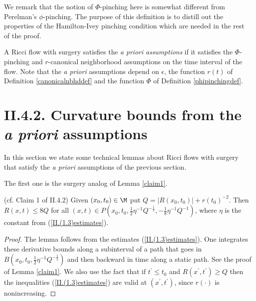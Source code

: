 We remark that the notion of $\Phi$-pinching here is somewhat
different from Perelman's $\phi$-pinching.  The purpose of
this definition is to distill out the properties of the
Hamilton-Ivey pinching condition which are needed in the rest of the
proof.

\begin{definition}
  \label{def:kl-priori-assumptions-surgery-priori-assumptions}
 \label{apriori}
A Ricci flow with surgery satisfies the {\em {\it a priori} assumptions}
if it satisfies the $\Phi$-pinching and $r$-canonical
neighborhood assumptions
on the time interval of the flow. Note that
the {\it a priori} assumptions depend on $\epsilon$, the function $r(t)$ of
Definition \ref{canonicalnbhddef}
and the function $\Phi$ of Definition \ref{phipinchingdef}.
\end{definition}



\section{II.4.2. Curvature bounds from the {\it a priori} assumptions}

In this section we state some technical lemmas about Ricci flows with surgery
that satisfy the {\em {\it a priori}} assumptions of the previous section.

The first one is the surgery
analog of  Lemma \ref{claim1}.

\begin{lemma}
  \label{lem:kl-curvature-bounds-from-priori-assumptions-estimates-curvature}
(cf. Claim 1 of II.4.2)
\label{claim1II.4.2}
Given $(x_0,t_0)\in\M$ put $Q = |R(x_0,t_0)|+r(t_0)^{-2}$.
Then $R(x,t)\leq 8Q$ for all
$(x,t) \in P(x_0,t_0,\frac12\eta^{-1}Q^{-\frac12},
-\frac18\eta^{-1}Q^{-1})$, where $\eta$ is the constant from
(\ref{II.(1.3)estimates}).
\end{lemma}
\begin{proof}
The lemma follows from the estimates (\ref{II.(1.3)estimates}).
One integrates these derivative bounds along a subinterval of
a path that goes
in $B(x_0,t_0,\frac12\eta^{-1}Q^{-\frac12})$ and then
backward in time along a static path. See the proof of
Lemma \ref{claim1}.
We also use the fact that if $t^\prime \le t_0$ and
$R(x^\prime, t^\prime) \ge Q$ then the inequalities
(\ref{II.(1.3)estimates}) are valid at $(x^\prime, t^\prime)$,
since $r(\cdot)$ is nonincreasing.
\end{proof}

